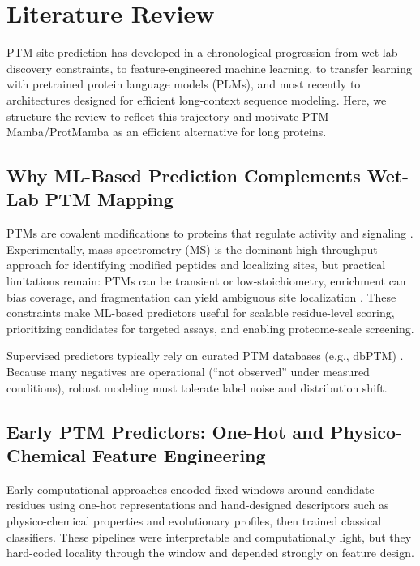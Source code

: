 \documentclass[conference]{IEEEtran}
\begin{document}
\section{Literature Review}
PTM site prediction has developed in a chronological progression from wet-lab discovery constraints, to feature-engineered machine learning, to transfer learning with pretrained protein language models (PLMs), and most recently to architectures designed for efficient long-context sequence modeling. Here, we structure the review to reflect this trajectory and motivate PTM-Mamba/ProtMamba as an efficient alternative for long proteins.


\subsection{Why ML-Based Prediction Complements Wet-Lab PTM Mapping}
PTMs are covalent modifications to proteins that regulate activity and signaling \cite{zhong2023ptm}. Experimentally, mass spectrometry (MS) is the dominant high-throughput approach for identifying modified peptides and localizing sites, but practical limitations remain: PTMs can be transient or low-stoichiometry, enrichment can bias coverage, and fragmentation can yield ambiguous site localization \cite{messner2023mass}. These constraints make ML-based predictors useful for scalable residue-level scoring, prioritizing candidates for targeted assays, and enabling proteome-scale screening.

Supervised predictors typically rely on curated PTM databases (e.g., dbPTM) \cite{li2022dbptm}. Because many negatives are operational (``not observed'' under measured conditions), robust modeling must tolerate label noise and distribution shift.

\subsection{Early PTM Predictors: One-Hot and Physico-Chemical Feature Engineering}
Early computational approaches encoded fixed windows around candidate residues using one-hot representations and hand-designed descriptors such as physico-chemical properties and evolutionary profiles, then trained classical classifiers. These pipelines were interpretable and computationally light, but they hard-coded locality through the window and depended strongly on feature design.
\end{document}
